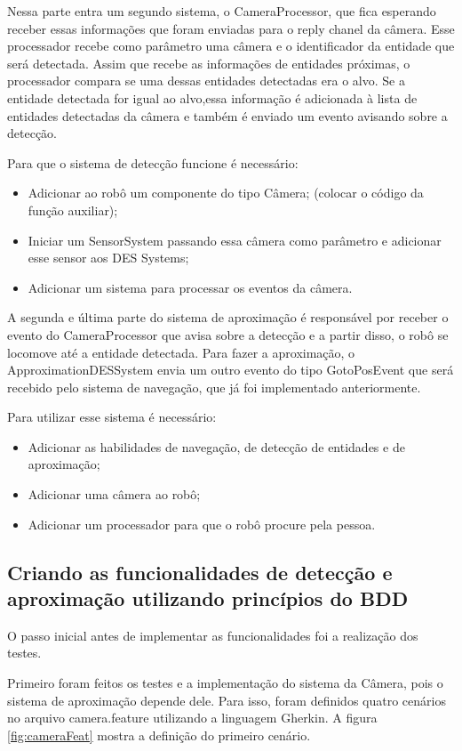Nessa parte entra um segundo sistema, o CameraProcessor, que fica esperando receber essas informações que foram enviadas para o reply chanel da câmera. Esse processador recebe como parâmetro uma câmera e o identificador da entidade que será detectada. Assim que recebe as informações de entidades próximas, o processador compara se uma dessas entidades detectadas era o alvo. Se a entidade detectada for igual ao alvo,essa informação é adicionada à lista de entidades detectadas da câmera e também é enviado um evento avisando sobre a detecção.

Para que o sistema de detecção funcione é necessário:
\begin{itemize}
    \item Adicionar ao robô um componente do tipo Câmera; (colocar o código da função auxiliar);
    \item Iniciar um SensorSystem passando essa câmera como parâmetro e adicionar esse sensor aos DES Systems;
    \item Adicionar um sistema para processar os eventos da câmera.
\end{itemize}

A segunda e última parte do sistema de aproximação é responsável por receber o evento do CameraProcessor que avisa sobre a detecção e a partir disso, o robô se locomove até a entidade detectada. Para fazer a aproximação, o ApproximationDESSystem envia um outro evento do tipo GotoPosEvent que será recebido pelo sistema de navegação, que já foi implementado anteriormente.

Para utilizar esse sistema é necessário:
\begin{itemize}
    \item Adicionar as habilidades de navegação, de detecção de entidades e de aproximação;
    \item Adicionar uma câmera ao robô; 
    \item Adicionar um processador para que o robô procure pela pessoa.
\end{itemize}

\subsection{Criando as funcionalidades de detecção e aproximação utilizando princípios do BDD}
\label{sec:criandoFunc}
O passo inicial antes de implementar as funcionalidades foi a realização dos testes. 

Primeiro foram feitos os testes e a implementação do sistema da Câmera, pois o sistema de aproximação depende dele. Para isso, foram definidos quatro cenários no arquivo camera.feature utilizando a linguagem Gherkin. A figura \ref{fig:cameraFeat} mostra a definição do primeiro cenário.

